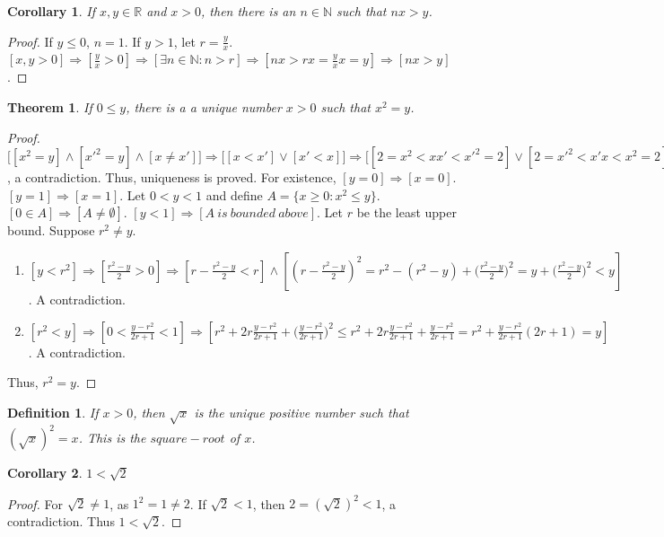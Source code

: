 \documentclass[oneside]{book}
\theoremstyle{mystyle}
\newtheorem{theorem}{Theorem}[section]
\newtheorem{definition}{Definition}[section]
\newtheorem{corollary}{Corollary}[section]
\begin{document}
\begin{corollary}
If $x,y\in \mathbb{R}$ and $x>0$, then there is an $n\in \mathbb{N}$ such that $nx>y$.
\end{corollary}
\begin{proof}
If $y\leq 0$, $n=1$. If $y>1$, let $r = \frac{y}{x}$. $[x,y>0]\Rightarrow [\frac{y}{x}>0]\Rightarrow [\exists n\in \mathbb{N}:n>r]\Rightarrow [nx > rx = \frac{y}{x}x = y]\Rightarrow[nx>y]$.
\end{proof}

\begin{theorem}
If $0\leq y$, there is a a unique number $x>0$ such that $x^2 = y$.
\end{theorem}
\begin{proof}
$\big[[x^2=y]\land [x'^2=y]\land [x\ne x']\big] \Rightarrow \big[[x<x']\lor[x'<x]\big] \Rightarrow \big[[2=x^2<xx'<x'^2=2]\lor[2=x'^2<x'x<x^2=2]\big]$, a contradiction. Thus, uniqueness is proved. For existence, $[y=0]\Rightarrow[x=0]$.$[y=1]\Rightarrow [x=1]$. Let $0 < y < 1$ and define $A = \{x\geq0:x^2 \leq y\}$. $[0\in A]\Rightarrow[A\ne \emptyset]$. $[y<1]\Rightarrow [A\ is\ bounded\ above]$. Let $r$ be the least upper bound. Suppose $r^2\ne y$.
\begin{enumerate}
\item $[y<r^2]\Rightarrow[\frac{r^2-y}{2}>0]\Rightarrow [r-\frac{r^2-y}{2}<r]\land[(r-\frac{r^2-y}{2})^2= r^2 - (r^2-y)+\big(\frac{r^2-y}{2}\big)^2 = y + \big(\frac{r^2-y}{2}\big)^2 < y]$. A contradiction.
\item $[r^2 <y]\Rightarrow [0<\frac{y-r^2}{2r+1}<1]\Rightarrow [r^2 + 2r\frac{y-r^2}{2r+1}+\big(\frac{y-r^2}{2r+1}\big)^2\leq r^2 + 2r\frac{y-r^2}{2r+1}+\frac{y-r^2}{2r+1} = r^2+\frac{y-r^2}{2r+1}(2r+1)=y]$. A contradiction.
\end{enumerate}
Thus, $r^2 = y$.
\end{proof}

\begin{definition}
If $x>0$, then $\sqrt{x}$ is the unique positive number such that $(\sqrt{x})^2 = x$. This is the $square-root$ of $x$.
\end{definition}

\begin{corollary}
$1<\sqrt{2}$
\end{corollary}
\begin{proof}
For $\sqrt{2} \ne 1$, as $1^2 = 1\ne 2$. If $\sqrt{2}<1$, then $2=(\sqrt{2})^2 <1$, a contradiction. Thus $1<\sqrt{2}$.
\end{proof}
\end{document}
